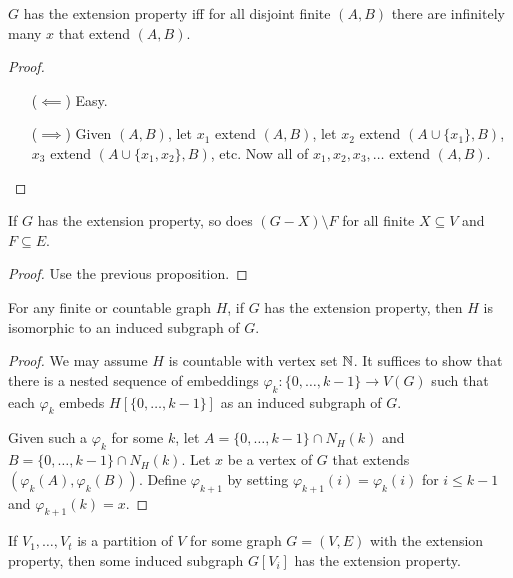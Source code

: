 \documentclass[main.tex]{subfiles}
\begin{document}
\begin{proposition}
  $G$ has the extension property iff for all disjoint finite $(A,B)$ there are
  infinitely many $x$ that extend $(A,B)$.
\end{proposition}
\begin{proof}
  \leavevmode\vspace{-0.25em}
  \begin{itemize}[leftmargin=*,labelindent=2.5em]
    \item[($\impliedby$)] Easy.

    \item[($\implies$)] Given $(A,B)$, let $x_1$ extend $(A,B)$, let
      $x_2$ extend $(A\cup\{x_1\}, B)$, $x_3$ extend $(A\cup\{x_1,x_2\}, B)$, etc.
      Now all of $x_1,x_2,x_3,\ldots$ extend $(A,B)$. \qedhere
  \end{itemize}
\end{proof}
\begin{proposition}
  If $G$ has the extension property, so does $(G - X)\setminus F$ for all
  finite $X\subseteq V$ and $F\subseteq E$.
\end{proposition}
\begin{proof}
  Use the previous proposition.
\end{proof}
\begin{proposition}
  For any finite or countable graph $H$, if $G$ has the extension property,
  then $H$ is isomorphic to an induced subgraph of $G$.
\end{proposition}
\begin{proof}
  We may assume $H$ is countable with vertex set $\mathbb N$.
  It suffices to show that there is a nested sequence of embeddings
  $\varphi_k:\{0,\ldots,k-1\}\to V(G)$ such that each $\varphi_k$ embeds
  $H[\{0,\ldots,k-1\}]$ as an induced subgraph of $G$.

  Given such a $\varphi_k$ for some $k$, let
  $A = \{0,\ldots,k-1\}\cap N_H(k)$ and $B = \{0,\ldots,k-1\}\cap N_H(k)$.
  Let $x$ be a vertex of $G$ that extends $(\varphi_k(A), \varphi_k(B))$.
  Define $\varphi_{k+1}$ by setting $\varphi_{k+1}(i) = \varphi_k(i)$
  for $i\leq k-1$ and $\varphi_{k+1}(k) = x$.
\end{proof}
\begin{proposition}%
  If $V_1,\ldots,V_t$ is a partition of $V$ for some graph $G = (V, E)$ with
  the extension property, then some induced subgraph $G[V_i]$ has the extension
  property.
\end{proposition}
\end{document}
